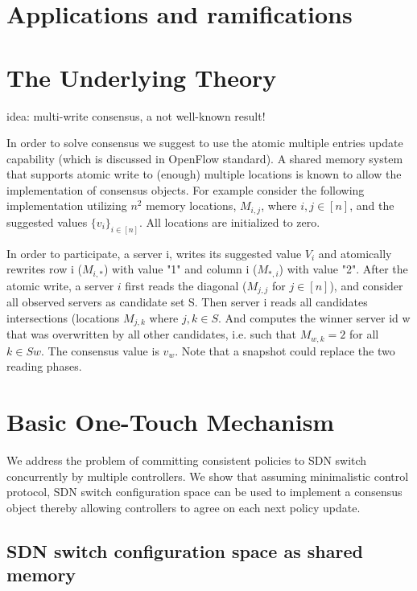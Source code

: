 \documentclass[conference]{sigcomm-alternate}
\begin{document}
\section{Applications and ramifications}\label{sec:application}



\section{The Underlying Theory}\label{sec:background}

idea: multi-write consensus, a not well-known result!

In order to solve consensus we suggest to use the atomic multiple entries update capability (which is discussed in OpenFlow standard). A shared memory system that supports atomic write to (enough) multiple locations is known to allow the implementation of consensus objects. For example consider the following implementation utilizing $n^2$ memory locations, $M_{i,j}$, where $i,j\in[n]$, and the suggested values $\{v_i\}_{i\in [n]}$. All locations are initialized to zero.

In order to participate, a server i, writes its suggested value $V_i$ and atomically rewrites row i ($M_{i,*}$) with value "1" and column i ($M_{*,i}$) with value "2". After the atomic write, a server $i$ first reads the diagonal ($M_{j,j}$ for $j\in [n]$), and consider all observed servers as candidate set S.  Then server i reads all candidates intersections (locations $M_{j,k}$ where $j,k\in S$. And computes the winner server id w that was overwritten by all other candidates, i.e. such that $M_{w,k}=2$ for all $k\in S {w}$. The consensus value is $v_w$.
Note that a snapshot could replace the two reading phases.



\section{Basic One-Touch Mechanism}\label{sec:realization}

We address the problem of committing consistent policies to SDN switch concurrently by multiple controllers.
We show that assuming minimalistic control protocol, SDN switch configuration space can be used to implement a consensus object thereby allowing controllers to agree on each next policy update.

\subsection{SDN switch configuration space as shared memory}
\end{document}
